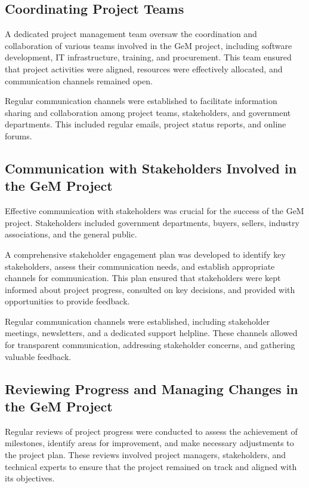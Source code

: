 \subsection{Coordinating Project Teams}

A dedicated project management team oversaw the coordination and collaboration of various teams involved in the GeM project, including software development, IT infrastructure, training, and procurement. This team ensured that project activities were aligned, resources were effectively allocated, and communication channels remained open.

Regular communication channels were established to facilitate information sharing and collaboration among project teams, stakeholders, and government departments. This included regular emails, project status reports, and online forums.

\subsection{Communication with Stakeholders Involved in the GeM Project}

Effective communication with stakeholders was crucial for the success of the GeM project. Stakeholders included government departments, buyers, sellers, industry associations, and the general public.

A comprehensive stakeholder engagement plan was developed to identify key stakeholders, assess their communication needs, and establish appropriate channels for communication. This plan ensured that stakeholders were kept informed about project progress, consulted on key decisions, and provided with opportunities to provide feedback.

Regular communication channels were established, including stakeholder meetings, newsletters, and a dedicated support helpline. These channels allowed for transparent communication, addressing stakeholder concerns, and gathering valuable feedback.

\subsection{Reviewing Progress and Managing Changes in the GeM Project}

Regular reviews of project progress were conducted to assess the achievement of milestones, identify areas for improvement, and make necessary adjustments to the project plan. These reviews involved project managers, stakeholders, and technical experts to ensure that the project remained on track and aligned with its objectives.

